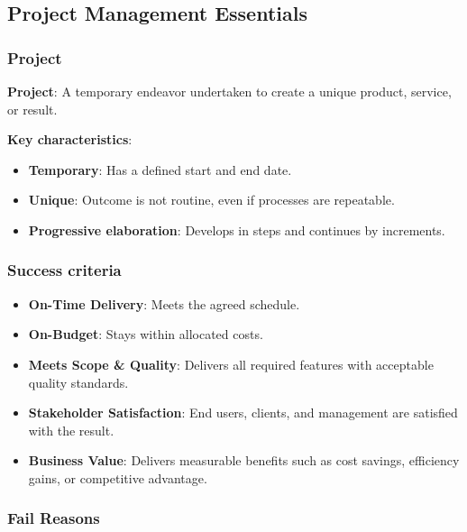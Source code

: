 \subsection{Project Management Essentials}

\subsubsection{Project}

\noindent\textbf{Project}: A temporary endeavor undertaken to create a unique product, service, or result.

\noindent\textbf{Key characteristics}:

\begin{itemize}
    \item \textbf{Temporary}: Has a defined start and end date.
    \item \textbf{Unique}: Outcome is not routine, even if processes are repeatable.
    \item \textbf{Progressive elaboration}: Develops in steps and continues by increments.
\end{itemize}

\subsubsection{Success criteria}

\begin{itemize}
    \item \textbf{On-Time Delivery}: Meets the agreed schedule.
    \item \textbf{On-Budget}: Stays within allocated costs.
    \item \textbf{Meets Scope \& Quality}: Delivers all required features with acceptable quality standards.
    \item \textbf{Stakeholder Satisfaction}: End users, clients, and management are satisfied with the result.
    \item \textbf{Business Value}: Delivers measurable benefits such as cost savings, efficiency gains, or competitive advantage.
\end{itemize}

\subsubsection{Fail Reasons}

